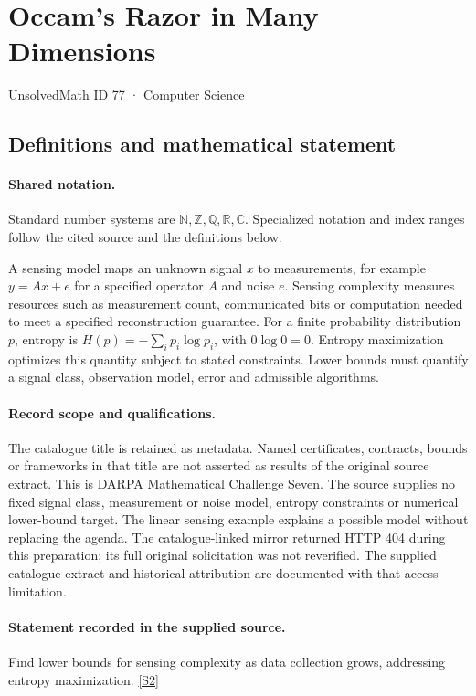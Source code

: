 \documentclass[11pt]{article}
\newcommand{\sref}[2]{\hyperlink{source:#1:#2}{[S#2]}}
\begin{document}
\setcounter{section}{76}
\section{Occam's Razor in Many Dimensions}\label{77}
{\small\sffamily UnsolvedMath ID 77 · Computer Science}
\subsection{Definitions and mathematical statement}

\paragraph{Shared notation.}Standard number systems are $\mathbb N,\mathbb Z,\mathbb Q,\mathbb R,\mathbb C$. Specialized notation and index ranges follow the cited source and the definitions below.


A sensing model maps an unknown signal $x$ to measurements, for example $y=Ax+e$ for a specified operator $A$ and noise $e$. Sensing complexity measures resources such as measurement count, communicated bits or computation needed to meet a specified reconstruction guarantee. For a finite probability distribution $p$, entropy is $H(p)=-\sum_i p_i\log p_i$, with $0\log0=0$. Entropy maximization optimizes this quantity subject to stated constraints. Lower bounds must quantify a signal class, observation model, error and admissible algorithms.
\paragraph{Record scope and qualifications.}
The catalogue title is retained as metadata. Named certificates, contracts, bounds or frameworks in that title are not asserted as results of the original source extract.
This is DARPA Mathematical Challenge Seven. The source supplies no fixed signal class, measurement or noise model, entropy constraints or numerical lower-bound target. The linear sensing example explains a possible model without replacing the agenda. The catalogue-linked mirror returned HTTP 404 during this preparation; its full original solicitation was not reverified. The supplied catalogue extract and historical attribution are documented with that access limitation.
\paragraph{Statement recorded in the supplied source.}
Find lower bounds for sensing complexity as data collection grows, addressing entropy maximization. \sref{77}{2}
\end{document}
